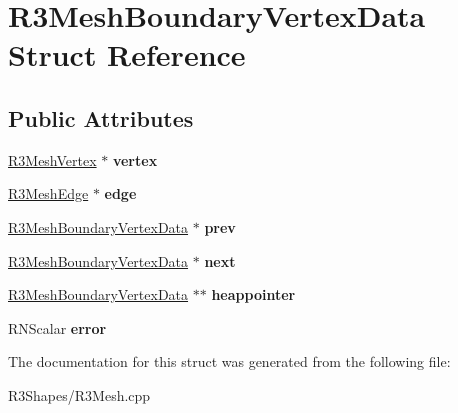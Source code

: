 \hypertarget{struct_r3_mesh_boundary_vertex_data}{}\section{R3\+Mesh\+Boundary\+Vertex\+Data Struct Reference}
\label{struct_r3_mesh_boundary_vertex_data}
\subsection*{Public Attributes}
\begin{DoxyCompactItemize}
\item 
\hyperlink{class_r3_mesh_vertex}{R3\+Mesh\+Vertex} $\ast$ {\bfseries vertex}\hypertarget{struct_r3_mesh_boundary_vertex_data_a0ed5aa88c6d92cc09a46a6161cb8df17}{}\label{struct_r3_mesh_boundary_vertex_data_a0ed5aa88c6d92cc09a46a6161cb8df17}

\item 
\hyperlink{class_r3_mesh_edge}{R3\+Mesh\+Edge} $\ast$ {\bfseries edge}\hypertarget{struct_r3_mesh_boundary_vertex_data_a1da65dbd79bc68686d4baef2043d1191}{}\label{struct_r3_mesh_boundary_vertex_data_a1da65dbd79bc68686d4baef2043d1191}

\item 
\hyperlink{struct_r3_mesh_boundary_vertex_data}{R3\+Mesh\+Boundary\+Vertex\+Data} $\ast$ {\bfseries prev}\hypertarget{struct_r3_mesh_boundary_vertex_data_a1b34b70b322d61d2b1771b43c439d179}{}\label{struct_r3_mesh_boundary_vertex_data_a1b34b70b322d61d2b1771b43c439d179}

\item 
\hyperlink{struct_r3_mesh_boundary_vertex_data}{R3\+Mesh\+Boundary\+Vertex\+Data} $\ast$ {\bfseries next}\hypertarget{struct_r3_mesh_boundary_vertex_data_a672be07901bb45d8763a9c9e4affbf47}{}\label{struct_r3_mesh_boundary_vertex_data_a672be07901bb45d8763a9c9e4affbf47}

\item 
\hyperlink{struct_r3_mesh_boundary_vertex_data}{R3\+Mesh\+Boundary\+Vertex\+Data} $\ast$$\ast$ {\bfseries heappointer}\hypertarget{struct_r3_mesh_boundary_vertex_data_a0f6ce08256bbd0da41c416ae175b388f}{}\label{struct_r3_mesh_boundary_vertex_data_a0f6ce08256bbd0da41c416ae175b388f}

\item 
R\+N\+Scalar {\bfseries error}\hypertarget{struct_r3_mesh_boundary_vertex_data_ad55fc386a22ba1f3151fca4e70d5cae7}{}\label{struct_r3_mesh_boundary_vertex_data_ad55fc386a22ba1f3151fca4e70d5cae7}

\end{DoxyCompactItemize}


The documentation for this struct was generated from the following file\+:\begin{DoxyCompactItemize}
\item 
R3\+Shapes/R3\+Mesh.\+cpp\end{DoxyCompactItemize}
